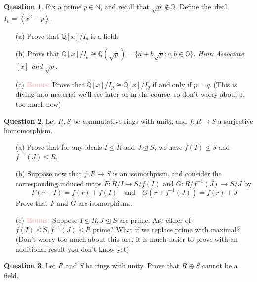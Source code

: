 \documentclass[11pt]{article}
\def\mbb{\mathbb}
\def\Q{\mbb{Q}}
\def\N{\mbb{N}}
\def\and{\quad \text{and} \quad}
\newcommand{\Ang}[1]{\left\langle #1 \right\rangle}
\theoremstyle{pink}
\theoremstyle{boxedsolution}
\theoremstyle{definition}
\newtheorem{question}{Question}
\theoremstyle{claim}
\begin{document}
\begin{question}
Fix a prime $p \in \N$, and recall that $\sqrt{p} \notin \Q$. Define the ideal $I_p = \Ang{x^2-p}$.
\begin{enumerate}
    \item[(a)] Prove that $\Q[x] / I_p$ is a field.
    
    \item[(b)] Prove that $\Q[x]/ I_p \cong \Q(\sqrt{p}) = \{a+b\sqrt{p}: a, b \in \Q\}$. \textit{Hint: Associate $[x]$ and $\sqrt{p}$}. 
    
    \item[(c)] \textcolor{pink}{\textbf{Bonus:}} Prove that $\Q[x]/I_p \cong \Q[x]/I_q$ if and only if $p = q$. (This is diving into material we'll see later on in the course, so don't worry about it too much now)
\end{enumerate}
\end{question}

\begin{question}
    Let $R,S$ be commutative rings with unity, and $f: R \to S$ a surjective homomorphism.
    \begin{enumerate}
        \item[(a)] Prove that for any ideals $I \trianglelefteq R$ and $J \trianglelefteq S$, we have $f(I) \trianglelefteq S$ and $f^{-1}(J) \trianglelefteq R$.
        
        \item[(b)] Suppose now that $f:R \to S$ is an isomorhpism, and consider the corresponding induced maps $F:R/I \to S/f(I)$ and $G:R/f^{-1}(J) \to S/J$ by
            \[
            F(r+I) = f(r) + f(I) \and G(r + f^{-1}(J)) = f(r) + J
            \]
        Prove that $F$ and $G$ are isomorphisms.
            
        \item[(c)] \textcolor{pink}{\textbf{Bonus:}} Suppose $I \trianglelefteq R, J \trianglelefteq S$ are prime. Are either of $f(I) \trianglelefteq S, f^{-1}(J) \trianglelefteq R$ prime? What if we replace prime with maximal? (Don't worry too much about this one, it is much easier to prove with an additional result you don't know yet)
    \end{enumerate}
\end{question}

\begin{question}
Let $R$ and $S$ be rings with unity. Prove that $R \oplus S$ cannot be a field.
\end{question}
\end{document}

